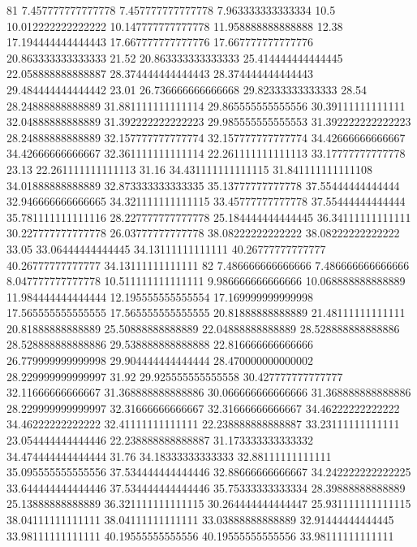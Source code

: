 81 7.457777777777778 7.457777777777778 7.963333333333334 10.5 10.012222222222222 10.147777777777778 11.958888888888888 12.38 17.194444444444443 17.667777777777776 17.667777777777776 20.863333333333333 21.52 20.863333333333333 25.414444444444445 22.058888888888887 28.374444444444443 28.374444444444443 29.484444444444442 23.01 26.736666666666668 29.82333333333333 28.54 28.24888888888889 31.881111111111114 29.865555555555556 30.39111111111111 32.04888888888889 31.392222222222223 29.985555555555553 31.392222222222223 28.24888888888889 32.157777777777774 32.157777777777774 34.42666666666667 34.42666666666667 32.361111111111114 22.261111111111113 33.17777777777778 23.13 22.261111111111113 31.16 34.431111111111115 31.841111111111108 34.01888888888889 32.873333333333335 35.13777777777778 37.55444444444444 32.946666666666665 34.321111111111115 33.45777777777778 37.55444444444444 35.781111111111116 28.227777777777778 25.184444444444445 36.34111111111111 30.227777777777778 26.03777777777778 38.08222222222222 38.08222222222222 33.05 33.06444444444445 34.13111111111111 40.26777777777777 40.26777777777777 34.13111111111111
82 7.486666666666666 7.486666666666666 8.047777777777778 10.511111111111111 9.986666666666666 10.068888888888889 11.984444444444444 12.195555555555554 17.169999999999998 17.565555555555555 17.565555555555555 20.81888888888889 21.48111111111111 20.81888888888889 25.50888888888889 22.04888888888889 28.528888888888886 28.528888888888886 29.538888888888888 22.816666666666666 26.779999999999998 29.904444444444444 28.470000000000002 28.229999999999997 31.92 29.925555555555558 30.427777777777777 32.11666666666667 31.368888888888886 30.066666666666666 31.368888888888886 28.229999999999997 32.31666666666667 32.31666666666667 34.46222222222222 34.46222222222222 32.41111111111111 22.238888888888887 33.23111111111111 23.054444444444446 22.238888888888887 31.173333333333332 34.474444444444444 31.76 34.18333333333333 32.88111111111111 35.095555555555556 37.534444444444446 32.88666666666667 34.242222222222225 33.644444444444446 37.534444444444446 35.75333333333334 28.39888888888889 25.13888888888889 36.321111111111115 30.264444444444447 25.931111111111115 38.04111111111111 38.04111111111111 33.03888888888889 32.91444444444445 33.98111111111111 40.19555555555556 40.19555555555556 33.98111111111111
